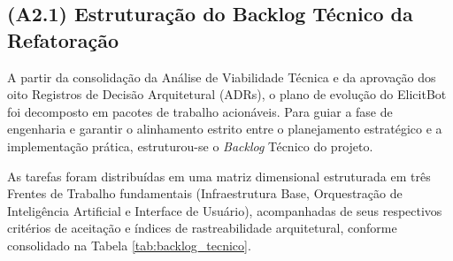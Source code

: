\subsection{(A2.1) Estruturação do Backlog Técnico da Refatoração}

A partir da consolidação da Análise de Viabilidade Técnica e da aprovação dos oito Registros de Decisão Arquitetural (ADRs), o plano de evolução do ElicitBot foi decomposto em pacotes de trabalho acionáveis. Para guiar a fase de engenharia e garantir o alinhamento estrito entre o planejamento estratégico e a implementação prática, estruturou-se o \textit{Backlog} Técnico do projeto.

As tarefas foram distribuídas em uma matriz dimensional estruturada em três Frentes de Trabalho fundamentais (Infraestrutura Base, Orquestração de Inteligência Artificial e Interface de Usuário), acompanhadas de seus respectivos critérios de aceitação e índices de rastreabilidade arquitetural, conforme consolidado na Tabela \ref{tab:backlog_tecnico}.

